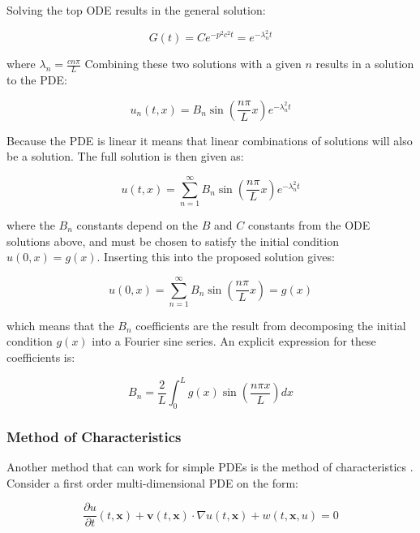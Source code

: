 Solving the top ODE results in the general solution:

\begin{equation*}
    G(t) = C e^{- p^2 c^2 t} = e^{- \lambda_n^2 t}
\end{equation*}

\noindent where $\lambda_n = \frac{c n \pi}{L}$ Combining these two solutions with a given $n$ results in a solution to the PDE:

\begin{equation*}
    u_n(t, x) = B_n \sin(\frac{n \pi}{L} x) e^{- \lambda_n^2 t}
\end{equation*}

Because the PDE is linear it means that linear combinations of solutions will also be a solution. The full solution is then given as:

\begin{equation*}
    u(t, x) = \sum_{n = 1}^{\infty} B_n \sin(\frac{n \pi}{L} x) e^{- \lambda_n^2 t}
\end{equation*}

\noindent where the $B_n$ constants depend on the $B$ and $C$ constants from the ODE solutions above, and must be chosen to satisfy the initial condition $u(0, x) = g(x)$. Inserting this into the proposed solution gives:

\begin{equation*}
    u(0, x) = \sum_{n = 1}^{\infty} B_n \sin(\frac{n \pi}{L} x) = g(x)
\end{equation*}

\noindent which means that the $B_n$ coefficients are the result from decomposing the initial condition $g(x)$ into a Fourier sine series. An explicit expression for these coefficients is:

\begin{equation*}
    B_n = \frac{2}{L} \int_{0}^{L} g(x) \sin(\frac{n \pi x}{L}) dx
    \label{eq:fourierpdecoeff}
\end{equation*}

\subsubsection{Method of Characteristics}

Another method that can work for simple PDEs is the method of characteristics \cite{pdebookcourse}. Consider a first order multi-dimensional PDE on the form:

\begin{equation}
    \frac{\partial u}{\partial t}(t, \bm{x}) + \bm{v}(t, \bm{x}) \cdot \nabla u(t, \bm{x}) + w(t, \bm{x}, u) = 0
    \label{eq:generaltransportequation}
\end{equation}

